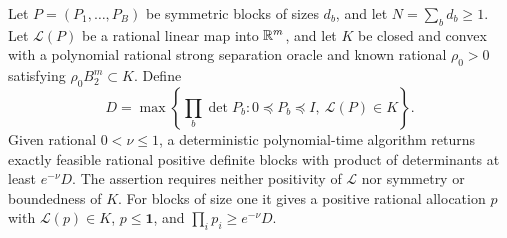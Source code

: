 \begin{lemma}\label{lem:block-logdet-oracle}
Let $P=(P_1,\ldots,P_B)$ be symmetric blocks of sizes $d_b$, and let
$N=\sum_bd_b\ge1$. Let $\mathcal L(P)$ be a rational linear map into
$\mathbb R^m$, and let $K$ be closed and convex with a polynomial rational
strong separation oracle and known rational $\rho_0>0$ satisfying
$\rho_0B_2^m\subset K$. Define
\[
 D=\max\left\{\prod_b\det P_b:0\preceq P_b\preceq I,
                                    \ \mathcal L(P)\in K\right\}.
\]
Given rational $0<\nu\le1$, a deterministic polynomial-time algorithm
returns exactly feasible rational positive definite blocks with product
of determinants at least $e^{-\nu}D$. The assertion requires neither
positivity of $\mathcal L$ nor symmetry or boundedness of $K$.
For blocks of size one it gives a positive rational allocation $p$ with
$\mathcal L(p)\in K$, $p\le\mathbf1$, and $\prod_ip_i\ge e^{-\nu}D$.
\end{lemma}
